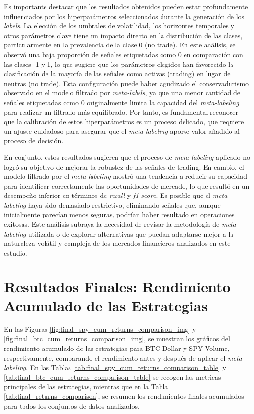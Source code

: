 \documentclass[a4paper,12pt, twoside]{report}
\begin{document}
Es importante destacar que los resultados obtenidos pueden estar profundamente influenciados por los hiperparámetros 
seleccionados durante la generación de los \textit{labels}. La elección de los umbrales de volatilidad, 
los horizontes temporales y otros parámetros clave tiene un impacto directo en la distribución de las clases, 
particularmente en la prevalencia de la clase 0 (no trade). En este análisis, se observó una baja proporción 
de señales etiquetadas como 0 en comparación con las clases -1 y 1, lo que sugiere que los parámetros 
elegidos han favorecido la clasificación de la mayoría de las señales como activas (trading) en lugar de neutras 
(no trade). Esta configuración puede haber agudizado el conservadurismo observado en el modelo filtrado por 
\textit{meta-labels}, ya que una menor cantidad de señales etiquetadas como 0 originalmente limita la capacidad 
del \textit{meta-labeling} para realizar un filtrado más equilibrado. Por tanto, es fundamental reconocer que la 
calibración de estos hiperparámetros es un proceso delicado, que requiere un ajuste cuidadoso para asegurar que 
el \textit{meta-labeling} aporte valor añadido al proceso de decisión.

En conjunto, estos resultados sugieren que el proceso de \textit{meta-labeling} aplicado no logró su objetivo de 
mejorar la robustez de las señales de trading. En cambio, el modelo filtrado por el \textit{meta-labeling} mostró 
una tendencia a reducir su capacidad para identificar correctamente las oportunidades de mercado, lo que resultó 
en un desempeño inferior en términos de \textit{recall} y \textit{f1-score}. Es posible que el \textit{meta-labeling} 
haya sido demasiado restrictivo, eliminando señales que, aunque inicialmente parecían menos seguras, podrían haber 
resultado en operaciones exitosas. Este análisis subraya la necesidad de revisar la metodología de \textit{meta-labeling} 
utilizada o de explorar alternativas que puedan adaptarse mejor a la naturaleza volátil y compleja de los mercados 
financieros analizados en este estudio.

\section{Resultados Finales: Rendimiento Acumulado de las Estrategias}


En las Figuras \ref{fig:final_spy_cum_returns_comparison_img} y \ref{fig:final_btc_cum_returns_comparison_img}, 
se muestran los gráficos del rendimiento acumulado de las estrategias para BTC Dollar y SPY Volume, respectivamente, 
comparando el rendimiento antes y después de aplicar el \textit{meta-labeling}. En las Tablas 
\ref{tab:final_spy_cum_returns_comparison_table} y \ref{tab:final_btc_cum_returns_comparison_table} se recogen 
las metricas principales de las estrategias, mientras que en la Tabla \ref{tab:final_returns_comparison}, 
se resumen los rendimientos finales acumulados para todos los conjuntos de datos analizados. 
\end{document}
